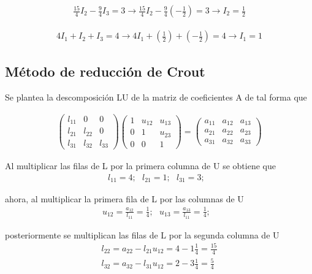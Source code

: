 \documentclass[a4paper, 12pt]{article}
\begin{document}
\begin{align*}
\frac{15}{4}I_2 - \frac{9}{4}I_3 = 3 
\rightarrow
\frac{15}{4}I_2 - \frac{9}{4}(-\frac{1}{2}) = 3
\rightarrow
I_2 = \frac{1}{2}
\end{align*}

\begin{align*}
4I_1 + I_2 + I_3 = 4 
\rightarrow
4I_1 + (\frac{1}{2}) + (-\frac{1}{2}) = 4
\rightarrow
I_1 = 1
\end{align*}

\subsection*{Método de reducción de Crout}
Se plantea la descomposición LU de la matriz de coeficientes A de tal forma que

\begin{align*}
\begin{pmatrix}
  l_{11} & 0 & 0\\
  l_{21} & l_{22} & 0\\
  l_{31} & l_{32} & l_{33}
\end{pmatrix} 
\begin{pmatrix}
  1 & u_{12} & u_{13}\\
  0 & 1 & u_{23}\\
  0 & 0 & 1
\end{pmatrix}
=
\begin{pmatrix}
  a_{11} & a_{12} & a_{13}\\
  a_{21} & a_{22} & a_{23}\\
  a_{31} & a_{32} & a_{33}
\end{pmatrix}
\end{align*}

Al multiplicar las filas de L por la primera columna de U se obtiene que
\begin{align*}
l_{11} = 4;~~~
l_{21} = 1;~~~
l_{31} = 3;~~~
\end{align*}

ahora, al multiplicar la primera fila de L por las columnas de U
\begin{align*}
u_{12} = \frac{a_{12}}{l_{11}} = \frac{1}{4};~~~
u_{13} = \frac{a_{13}}{l_{11}} = \frac{1}{4};~~~
\end{align*}

posteriormente se multiplican las filas de L por la segunda columna de U
\begin{align*}
l_{22} = a_{22} - l_{21}u_{12} = 4 - 1\frac{1}{4} = \frac{15}{4}\\
l_{32} = a_{32} - l_{31}u_{12} = 2 - 3\frac{1}{4} = \frac{5}{4}
\end{align*}
\end{document}
